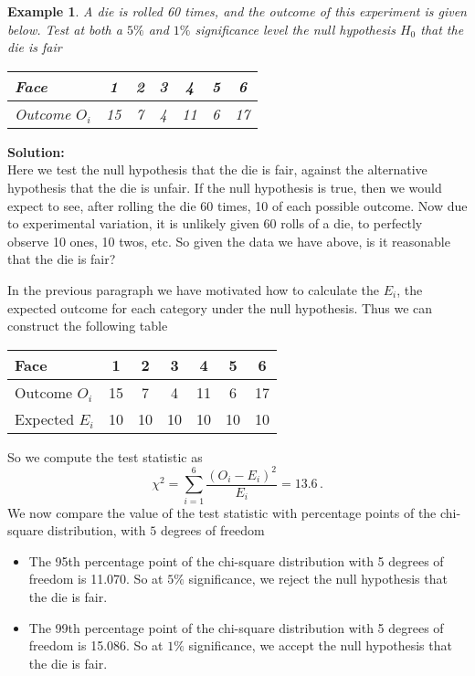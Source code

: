 \documentclass[12pt]{article}
\theoremstyle{break}
\newtheorem{example}[theorem]{Example}
\begin{document}
\begin{example}
A die is rolled 60 times, and the outcome of this experiment is given below. Test at both a $5\%$ and $1\%$ significance level the null hypothesis $H_{0}$ that the die is fair
\begin{center}
\begin{tabular}{|l|c|c|c|c|c|c|}
  \hline
  Face & 1 & 2 & 3 & 4 & 5 & 6 \\ \hline
  Outcome $O_{i}$ & 15 & 7 & 4 & 11 & 6 & 17 \\
  \hline
\end{tabular}
\end{center}
\end{example}
\begin{mdframed}
{\bf Solution:}\\
Here we test the null hypothesis that the die is fair, against the alternative hypothesis that the die is unfair. If the null hypothesis is true, then we would expect to see, after rolling the die 60 times, 10 of each possible outcome. Now due to experimental variation, it is unlikely given $60$ rolls of a die, to perfectly observe 10 ones, 10 twos, etc. So given the data we have above, is it reasonable that the die is fair?

In the previous paragraph we have motivated how to calculate the $E_{i}$, the expected outcome for each category under the null hypothesis. Thus we can construct the following table
\begin{center}
\begin{tabular}{|l|c|c|c|c|c|c|}
  \hline
  Face & 1 & 2 & 3 & 4 & 5 & 6 \\ \hline
  Outcome $O_{i}$ & 15 & 7 & 4 & 11 & 6 & 17 \\
  Expected $E_{i}$ & 10 & 10 & 10 &10 &10 &10\\
  \hline
\end{tabular}
\end{center}

So we compute the test statistic as
$$
\chi^{2}=\sum_{i=1}^{6}\frac{(O_{i}-E_{i})^2}{E_{i}}=13.6 \, .
$$
We now compare the value of the test statistic with percentage points of the chi-square distribution, with $5$ degrees of freedom
\begin{itemize}
\item The 95th percentage point of the chi-square distribution with 5 degrees of freedom is 11.070. So at $5\%$ significance, we reject the null hypothesis that the die is fair.
\item The 99th percentage point of the chi-square distribution with 5 degrees of freedom is 15.086. So at $1\%$ significance, we accept the null hypothesis that the die is fair.
\end{itemize}
\end{mdframed}
\end{document}
